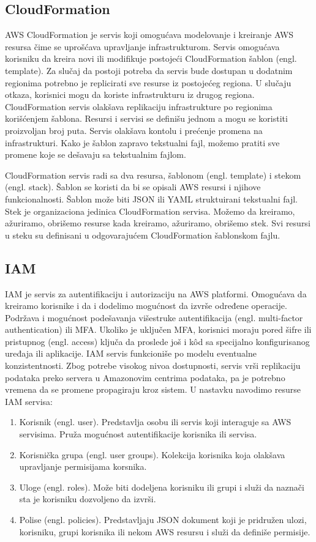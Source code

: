 \documentclass[12pt,oneside]{memoir}
\begin{document}
\subsection{CloudFormation}
 
AWS CloudFormation je servis koji omogućava modelovanje i kreiranje AWS resursa čime se uprošćava upravljanje infrastrukturom. Servis omogućava korisniku da kreira novi ili modifikuje postojeći CloudFormation šablon (engl. template). Za slučaj da postoji potreba da servis bude dostupan u dodatnim regionima potrebno je replicirati sve resurse iz postojećeg regiona. U slučaju otkaza, korisnici mogu da koriste infrastrukturu iz drugog regiona. CloudFormation servis olakšava replikaciju infrastrukture po regionima korišćenjem šablona. Resursi i servisi se definišu jednom a mogu se koristiti proizvoljan broj puta. Servis olakšava kontolu i prećenje promena na infrastrukturi. Kako je šablon zapravo tekstualni fajl, možemo pratiti sve promene koje se dešavaju sa tekstualnim fajlom.
 
CloudFormation servis radi sa dva resursa, šablonom (engl. template) i stekom (engl. stack). Šablon se koristi da bi se opisali AWS resursi i njihove funkcionalnosti. Šablon može biti JSON ili YAML struktuirani tekstualni fajl. Stek je organizaciona jedinica CloudFormation servisa. Možemo da kreiramo, ažuriramo, obrišemo resurse kada kreiramo, ažuriramo, obrišemo stek. Svi resursi u steku su definisani u odgovarajućem CloudFormation šablonskom fajlu.
 
\subsection{IAM}
 
IAM je servis za autentifikaciju i autorizaciju na AWS platformi. Omogućava da kreiramo korisnike i da i dodelimo mogućnost da izvrše određene operacije. Podržava i mogućnost podešavanja višestruke autentifikacija (engl. multi-factor authentication) ili MFA. Ukoliko je uključen MFA, korisnici moraju pored šifre ili pristupnog (engl. access) ključa da proslede još i kôd sa specijalno konfigurisanog uređaja ili aplikacije. IAM servis funkcioniše po modelu eventualne konzistentnosti. Zbog potrebe visokog nivoa dostupnosti, servis vrši replikaciju podataka preko servera u Amazonovim centrima podataka, pa je potrebno vremena da se promene propagiraju kroz sistem. U nastavku navodimo resurse IAM servisa:
\begin{enumerate}
  \item Korisnik (engl. user). Predstavlja osobu ili servis koji interaguje sa AWS servisima. Pruža mogućnost autentifikacije korisnika ili servisa.
  \item Korisnička grupa (engl. user groups). Kolekcija korisnika koja olakšava upravljanje permisijama korsnika.
  \item Uloge (engl. roles). Može biti dodeljena korisniku ili grupi i služi da naznači sta je korisniku dozvoljeno da izvrši.
  \item Polise (engl. policies). Predstavljaju JSON dokument koji je pridružen ulozi, korisniku, grupi korisnika ili nekom AWS resursu i služi da definiše permisije.
\end{enumerate}
\end{document}
